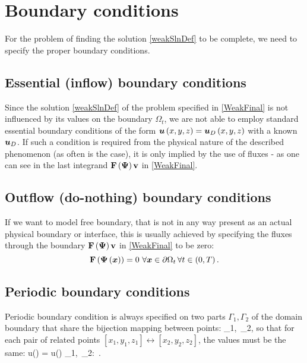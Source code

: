 \section{Boundary conditions}
\label{section:bcs}
For the problem of finding the solution \ref{weakSlnDef} to be complete, we need to specify the proper boundary conditions.
\subsection{Essential (inflow) boundary conditions}

Since the solution \ref{weakSlnDef} of the problem specified in \ref{WeakFinal} is not influenced by its values on the boundary $\Omega_t$, we are not able to employ standard essential boundary conditions of the form $\mbox{\boldmath $u$}\left(x, y, z\right) = \mbox{\boldmath $u$}_D\left(x, y, z\right)$ with a known $\mbox{\boldmath $u$}_D$.
If such a condition is required from the physical nature of the described phenomenon (as often is the case), it is only implied by the use of fluxes - as one can see in the last integrand $\mathrm{\mathbf{F}}\left(\mathrm{\mathbf{\Psi}}\right) \mathrm{\mathbf{v}}$ in \ref{WeakFinal}.


\subsection{Outflow (do-nothing) boundary conditions}
If we want to model free boundary, that is not in any way present as an actual physical boundary or interface, this is usually achieved by specifying the fluxes through the boundary $\mathrm{\mathbf{F}}\left(\mathrm{\mathbf{\Psi}}\right) \mathrm{\mathbf{v}}$ in \ref{WeakFinal} to be zero:
$$
\mrF\lo\mrPsi\lo\bfx\ro\ro = 0\ \forall\bfx\in\partial\Omega_t\, \forall t\in \lo0, T\ro.
$$


\subsection{Periodic boundary conditions}
Periodic boundary condition is always specified on two parts $\Gamma_1, \Gamma_2$ of the domain boundary that share the bijection mapping between points:
\be
\label{periodicMapping}
\left[x_1, y_1, z_1\right] \leftrightarrow \left[x_2, y_2, z_2\right] \forall \left[x_1, y_1, z_1\right] \in \Gamma_1,\ \forall \left[x_2, y_2, z_2\right] \in \Gamma_2,
\ee
so that for each pair of related points $\left[x_1, y_1, z_1\right] \leftrightarrow \left[x_2, y_2, z_2\right]$, the values must be the same:
\be
\label{periodicBCs}
u\left(\left[x_1, y_1, z_1\right]\right) = u\left(\left[x_2, y_2, z_2\right]\right) \forall \left[x_1, y_1, z_1\right] \in \Gamma_1,\ \forall \left[x_2, y_2, z_2\right] \in \Gamma_2:\, \left[x_1, y_1, z_1\right] \leftrightarrow \left[x_2, y_2, z_2\right].
\ee
